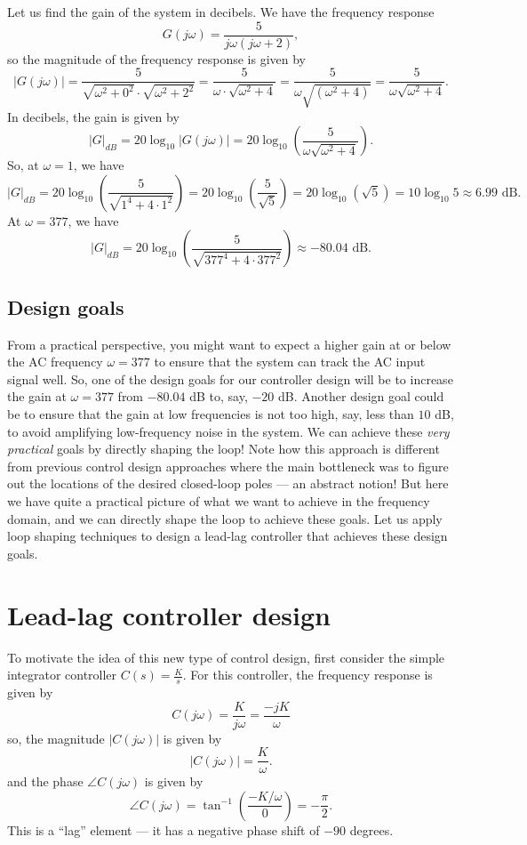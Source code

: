 \documentclass{ee122_notes}
\begin{document}
Let us find the gain of the system in decibels. We have the frequency response
\[
G(j\omega) = \frac{5}{j\omega (j\omega + 2)},
\]
so the magnitude of the frequency response is given by
\[
|G(j\omega)| = \frac{5}{\sqrt{\omega^2 + 0^2} \cdot \sqrt{\omega^2 + 2^2}} = \frac{5}{\omega \cdot \sqrt{\omega^2 + 4}} = \frac{5}{\omega\sqrt{(\omega^2 + 4)}} = \frac{5}{\omega \sqrt{\omega^2 + 4}}.
\] 
In decibels, the gain is given by
\[
|G|_{dB} = 20 \log_{10} |G(j\omega)| = 20 \log_{10} \left(\frac{5}{\omega\sqrt{\omega^2 + 4}}\right).
\] 
So, at $\omega = 1$, we have
\[
|G|_{dB} = 20 \log_{10} \left(\frac{5}{\sqrt{1^4 + 4 \cdot 1^2}}\right) = 20 \log_{10} \left(\frac{5}{\sqrt{5}}\right) = 20 \log_{10} \left(\sqrt{5}\right) = 10 \log_{10} 5 \approx 6.99 \text{ dB}.
\]
At $\omega = 377$, we have
\[
|G|_{dB} = 20 \log_{10} \left(\frac{5}{\sqrt{377^4 + 4 \cdot 377^2}}\right) \approx -80.04 \text{ dB}.
\]

\subsection{Design goals}
From a practical perspective, you might want to expect a higher gain at or below the AC frequency $\omega = 377$ to ensure that the system can track the AC input signal well. So, one of the design goals for our controller design will be to increase the gain at $\omega = 377$ from $-80.04$ dB to, say, $-20$ dB. Another design goal could be to ensure that the gain at low frequencies is not too high, say, less than $10$ dB, to avoid amplifying low-frequency noise in the system. We can achieve these \textit{very practical} goals by directly shaping the loop! Note how this approach is different from previous control design approaches where the main bottleneck was to figure out the locations of the desired closed-loop poles --- an abstract notion! But here we have quite a practical picture of what we want to achieve in the frequency domain, and we can directly shape the loop to achieve these goals. Let us apply loop shaping techniques to design a lead-lag controller that achieves these design goals. 

\section{Lead-lag controller design}
To motivate the idea of this new type of control design, first consider the simple integrator controller $C(s) = \frac{K}{s}$. For this controller, the frequency response is given by
\[
C(j\omega) = \frac{K}{j\omega} = \frac{-jK}{\omega} 
\]
so, the magnitude $|C(j\omega)|$ is given by
\[
|C(j\omega)| = \frac{K}{\omega}.
\]
and the phase $\angle C(j\omega)$ is given by
\[
\angle C(j\omega) = \tan ^{-1} \left(\frac{-K/\omega}{0}\right) = -\frac{\pi}{2}.
\]
This is a ``lag'' element --- it has a negative phase shift of $-90$ degrees. 
\end{document}

